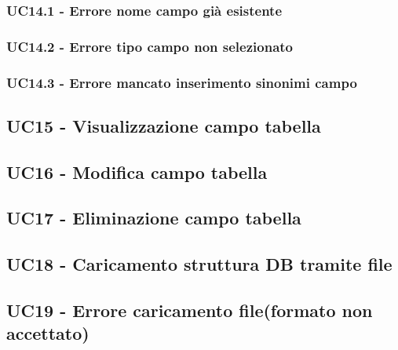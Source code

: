 \subsubsection{UC14.1 - Errore nome campo già esistente}
\label{sec:UC14.1}

\subsubsection{UC14.2 - Errore tipo campo non selezionato}
\label{sec:UC14.2}

\subsubsection{UC14.3 - Errore mancato inserimento sinonimi campo}
\label{sec:UC14.3}

\subsection{UC15 - Visualizzazione campo tabella}
\label{sec:UC15}

\subsection{UC16 - Modifica campo tabella}
\label{sec:UC16}

\subsection{UC17 - Eliminazione campo tabella}
\label{sec:UC17}

\subsection{UC18 - Caricamento struttura DB tramite file}
\label{sec:UC18}

\subsection{UC19 - Errore caricamento file(formato non accettato)}
\label{sec:UC19}

